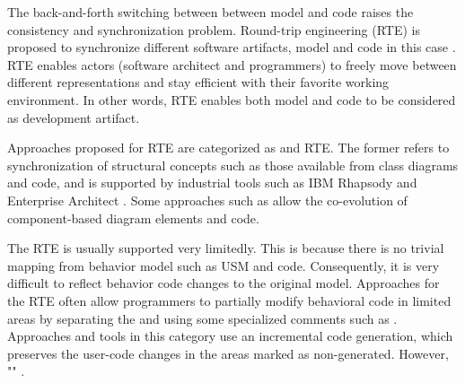 

The back-and-forth switching between between model and code raises the consistency and synchronization problem.
Round-trip engineering (RTE) \cite{Hettel2008} is proposed to synchronize different software artifacts, model and code in this case \cite{Sendall}. 
RTE enables actors (software architect and programmers) to freely move between different representations and stay efficient with their favorite working environment. 
In other words, RTE enables both model and code to be considered as development artifact. 


Approaches proposed for RTE are categorized as  and  RTE.
The former refers to synchronization of structural concepts such as those available from class diagrams and code, and is supported by industrial tools such as IBM Rhapsody \cite{ibm_rhapsody} and Enterprise Architect \cite{sparxsystems_enterprise_2014}.
Some approaches such as \cite{langhammer2013co, kramer2015change} allow the co-evolution of component-based diagram elements and code.

The  RTE is usually supported very limitedly. 
This is because there is no trivial mapping from behavior model such as USM and code.
Consequently, it is very difficult to reflect behavior code changes to the original model.
Approaches for the  RTE often allow programmers to partially modify behavioral code in limited areas by separating the  and  \cite{ibm_rhapsody,steinberg2008emf} using some specialized comments such as .
Approaches and tools in this category use an incremental code generation, which preserves the user-code changes in the areas marked as non-generated.
However, "" \cite{zheng2012enhancing}.


